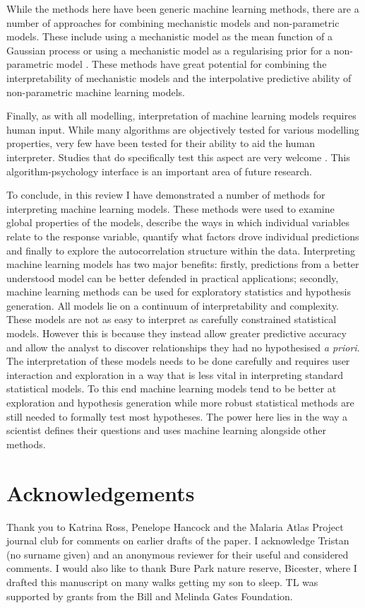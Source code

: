 \documentclass[12pt,]{article}
\begin{document}
While the methods here have been generic machine learning methods, there are a number of approaches for combining mechanistic models and non-parametric models.
These include using a mechanistic model as the mean function of a Gaussian process \citep{rasmussen2004gaussian} or using a mechanistic model as a regularising prior for a non-parametric model \citep{lyddon2018nonparametric}.
These methods have great potential for combining the interpretability of mechanistic models and the interpolative predictive ability of non-parametric machine learning models.

Finally, as with all modelling, interpretation of machine learning models requires human input.
While many algorithms are objectively tested for various modelling properties, very few have been tested for their ability to aid the human interpreter.
Studies that do specifically test this aspect are very welcome \citep{bastani2017interpreting}.
This algorithm-psychology interface is an important area of future research.

To conclude, in this review I have demonstrated  a number of methods for interpreting machine learning models.
These methods were used to examine global properties of the models, describe the ways in which individual variables relate to the response variable, quantify what factors drove individual predictions and finally to explore the autocorrelation structure within the data.
Interpreting machine learning models has two major benefits: firstly, predictions from a better understood model can be better defended in practical applications; secondly, machine learning methods can be used for exploratory statistics and hypothesis generation.
All models lie on a continuum of interpretability and complexity.
These models are not as easy to interpret as carefully constrained statistical models.
However this is because they instead allow greater predictive accuracy and allow the analyst to discover relationships they had no hypothesised \emph{a priori}.
The interpretation of these models needs to be done carefully and requires user interaction and exploration in a way that is less vital in interpreting standard statistical models.
To this end machine learning models tend to be better at exploration and hypothesis generation while more robust statistical methods are still needed to formally test most hypotheses.
The power here lies in the way a scientist defines their questions and uses machine learning alongside other methods.

 
\section{Acknowledgements}

Thank you to Katrina Ross, Penelope Hancock and the Malaria Atlas Project journal club for comments on earlier drafts of the paper.
I acknowledge Tristan (no surname given) and an anonymous reviewer for their useful and considered comments.
I would also like to thank Bure Park nature reserve, Bicester, where I drafted this manuscript on many walks getting my son to sleep.
TL was supported by grants from the Bill and Melinda Gates Foundation.



\end{document}
